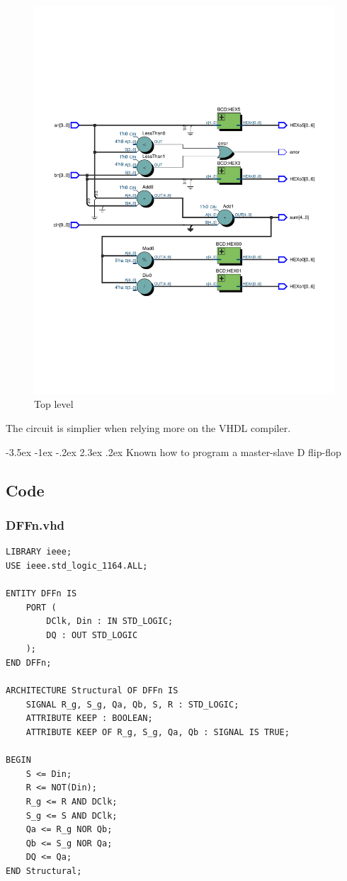 \documentclass[13pt,a4paper]{report}
\makeatletter
\renewcommand\section{\@startsection {section}{1}{-1em}%
  {-3.5ex \@plus -1ex \@minus -.2ex}%
  {2.3ex \@plus.2ex}%
  {\normalfont\Large\bfseries}}
\makeatother
\begin{document}
\begin{figure}[H]
\centering
\includegraphics[scale=0.7, clip, trim={0cm 7cm 0cm 7cm}]{images/Exc3_RTL.pdf}
\caption*{Top level}
\end{figure}

The circuit is simplier when relying more on the VHDL compiler.

\section{Known how to program a master-slave D flip-flop}

\subsection{Code}
\subsubsection{DFFn.vhd}
\begin{verbatim}
LIBRARY ieee;
USE ieee.std_logic_1164.ALL;

ENTITY DFFn IS
	PORT (
		DClk, Din : IN STD_LOGIC;
		DQ : OUT STD_LOGIC
	);
END DFFn;

ARCHITECTURE Structural OF DFFn IS
	SIGNAL R_g, S_g, Qa, Qb, S, R : STD_LOGIC;
	ATTRIBUTE KEEP : BOOLEAN;
	ATTRIBUTE KEEP OF R_g, S_g, Qa, Qb : SIGNAL IS TRUE;

BEGIN
	S <= Din;
	R <= NOT(Din);
	R_g <= R AND DClk;
	S_g <= S AND DClk;
	Qa <= R_g NOR Qb;
	Qb <= S_g NOR Qa;
	DQ <= Qa;
END Structural;
\end{verbatim}
\end{document}
